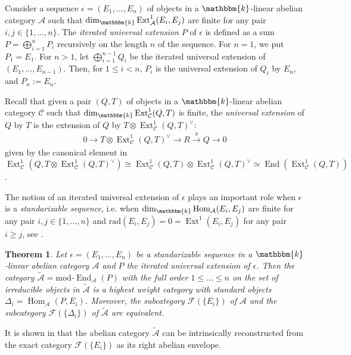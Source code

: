 \documentclass[12pt,a4paper]{amsart}
\newcommand{\aA}{{\mathcal{A}}}
\newcommand{\cC}{{\mathcal{C}}}
\newcommand{\fF}{{\mathcal{F}}}
\newcommand{\kk}{\mathbbm{k}}
\newcommand{\Hom}{\mathop{\textrm{Hom}}\nolimits}
\newcommand{\Ext}{\mathop{\operatorname{Ext}}\nolimits}
\newcommand{\End}{\mathop{\textrm{End}}\nolimits}
\newcommand{\wt}[1]{\widetilde{#1}}
\newtheorem{THM}[LEM]{Theorem}
\theoremstyle{definition}
\begin{document}
Consider a sequence $\epsilon = (E_1,\ldots,E_n)$ of objects in a $\kk$-linear abelian category $\aA$ such that $\dim_{\kk}\Ext^1_{\aA}(E_i,E_j)$ are finite  for any pair $i,j \in \{1,\ldots, n\}$. The \emph{iterated universal extension} $P $ of  $\epsilon$ is defined as a sum $P = \bigoplus_{i=1}^nP_i$ recursively on the length $n$ of the sequence. For $n=1$, we put $P_1 = E_1$. For $n>1$, let $\bigoplus_{i=1}^{n-1}Q_i$ be the iterated universal extension of $(E_1,\ldots, E_{n-1})$. Then, for $1\leq i < n$, $P_i$ is the universal extension of $Q_i$ by $E_n$, and $P_n := E_n$.

Recall that given a pair $(Q,T)$ of objects in a $\kk$-linear abelian category $\cC$ such that $\dim_{\kk}\Ext_{\cC}^1(Q,T)$ is finite, the \emph{universal extension} of $Q$ by $T$ is the extension of $Q$ by $T\otimes \Ext^1_{\cC}(Q,T)^\vee$:
\begin{align}\label{univ_extens}
0 \to T\otimes \Ext^1_{\cC}(Q, T)^\vee \to R \xrightarrow{\pi} Q \to 0
\end{align}  
given by the canonical element in $\Ext_{\cC}^1(Q, T \otimes \Ext_{\cC}^1(Q,T)^\vee) \cong \Ext_{\cC}^1(Q, T) \otimes \Ext_{\cC}^1(Q, T)^\vee\simeq \End(\Ext^1_{\cC}(Q,T))$. 

The notion of an iterated universal extension of $\epsilon$ plays an important role when $\epsilon$ is a \emph{standarizable sequence}, i.e. when $ \dim_{\kk}\Hom_{\aA}(E_i,E_j)$ are finite for any pair $i,j\in \{1,\ldots, n\}$ and $\textrm{rad}(E_i,E_j) =0 = \Ext^1(E_i,E_j)$ for any pair $i\geq j$, see \cite{DR}.

\begin{THM}\cite[Theorem 2]{DR}\label{thm_DR}
	Let $\epsilon = (E_1,\ldots, E_n)$ be a standarizable sequence in a $\kk$-linear abelian category $\aA$ and $P$ the iterated universal extension of $\epsilon$. Then the category $\wt{\aA} = \textrm{mod-}\End_{\aA}(P)$ with the full order $1\leq \ldots \leq n$ on the set of irreducible objects in $\wt{\aA}$ is a highest weight category with standard objects $\Delta_i = \Hom_{\aA}(P, E_i)$. Moreover, the subcategory $\fF(\{E_i\})$ of $\aA$ and the subcategory $\fF(\{\Delta_i\})$ of $\wt{\aA}$ are equivalent.
\end{THM}

It is shown in \cite{BodBon4} that the abelian category $\wt{\aA}$ can be intrinsically reconstructed from the exact category $\fF(\{E_i\})$  as its right abelian envelope.



\vspace{0.3cm}
\end{document}
